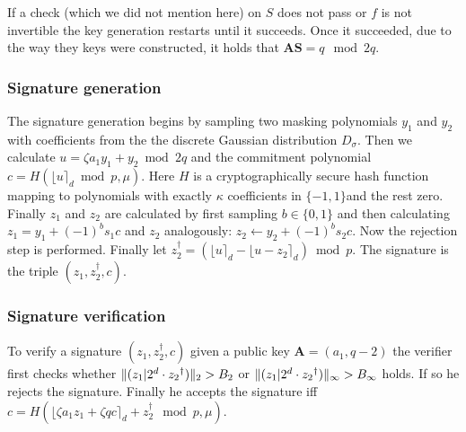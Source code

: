 If a check (which we did not mention here) on $S$ does not pass or $f$ is not invertible the key generation restarts until it succeeds. Once it succeeded, due to the way they keys were constructed, it holds that $\bm{A}\bm{S} = q \mod 2q$.

\subsubsection{Signature generation}
The signature generation begins by sampling two masking polynomials $y_{1}$ and $y_{2}$ with coefficients from the the discrete Gaussian distribution $D_{\sigma}$.
Then we calculate $u = \zeta a_{1} y_{1} + y_{2} \bmod 2q$ and the commitment polynomial $c = H({\lfloor u \rceil}_{d} \bmod p, \mu)$.
Here $H$ is a cryptographically secure hash function mapping to polynomials with exactly $\kappa$ coefficients in $\{-1, 1\}$and the rest zero.
Finally $z_{1}$ and $z_{2}$ are calculated by first sampling $b \in \{0,1\}$ and then calculating $z_{1} = y_{1} + (-1)^{b} s_{1}c$ and $z_{2}$ analogously:  $z_{2} \leftarrow y_{2} + (-1)^{b} s_{2}c$.
Now the rejection step is performed. Finally let $z_2^\dagger = (\lfloor u \rceil_d - \lfloor u - z_2\rceil_d) \bmod p$.
The signature is the triple $(z_{1}, z^{\dagger}_{2}, c)$.

\subsubsection{Signature verification}

To verify a signature $(z_1, z_2^\dagger, c)$ given a public key $\bm{A} = (a_1, q - 2)$ the verifier first checks whether $\lVert(z_1 \vert 2^d \cdot {z_2}^\dagger)\rVert_2 > B_2$ or
$\lVert(z_1 \vert 2^d \cdot {z_2}^\dagger)\rVert_\infty > B_\infty$ holds.
If so he rejects the signature. Finally he accepts the signature iff $c = H(\lfloor ζ a_1 z_1 + ζ q c\rceil_d + z_2^\dagger \mod p, μ)$.
 
